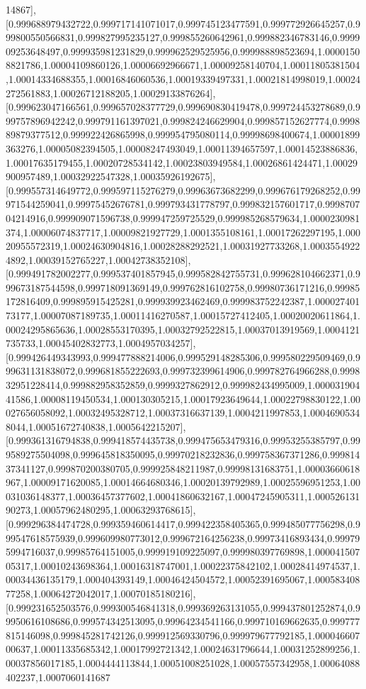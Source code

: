 \documentclass{article}
\begin{document}
14867],[0.999688979432722,0.999717141071017,0.999745123477591,0.999772926645257,0.999800550566831,0.999827995235127,0.999855260642961,0.999882346783146,0.999909253648497,0.999935981231829,0.999962529525956,0.999988898523694,1.00001508821786,1.00004109860126,1.00006692966671,1.00009258140704,1.00011805381504,1.00014334688355,1.00016846060536,1.00019339497331,1.00021814998019,1.00024272561883,1.00026712188205,1.00029133876264],[0.999623047166561,0.999657028377729,0.999690830419478,0.999724453278689,0.999757896942242,0.999791161397021,0.999824246629904,0.999857152627774,0.999889879377512,0.999922426865998,0.999954795080114,0.99998698400674,1.00001899363276,1.00005082394505,1.00008247493049,1.00011394657597,1.00014523886836,1.00017635179455,1.00020728534142,1.00023803949584,1.00026861424471,1.00029900957489,1.00032922547328,1.00035926192675],[0.999557314649772,0.999597115276279,0.99963673682299,0.999676179268252,0.99971544259041,0.99975452676781,0.999793431778797,0.999832157601717,0.999870704214916,0.999909071596738,0.999947259725529,0.999985268579634,1.0000230981374,1.00006074837717,1.00009821927729,1.0001355108161,1.00017262297195,1.00020955572319,1.00024630904816,1.00028288292521,1.00031927733268,1.00035549224892,1.00039152765227,1.00042738352108],[0.999491782002277,0.999537401857945,0.999582842755731,0.999628104662371,0.999673187544598,0.999718091369149,0.999762816102758,0.99980736171216,0.99985172816409,0.999895915425281,0.999939923462469,0.999983752242387,1.00002740173177,1.00007087189735,1.00011416270587,1.00015727412405,1.00020020611864,1.00024295865636,1.00028553170395,1.00032792522815,1.00037013919569,1.0004121735733,1.00045402832773,1.0004957034257],[0.999426449343993,0.999477888214006,0.999529148285306,0.999580229509469,0.999631131838072,0.999681855222693,0.999732399614906,0.999782764966288,0.999832951228414,0.999882958352859,0.9999327862912,0.999982434995009,1.00003190441586,1.00008119450534,1.000130305215,1.00017923649644,1.00022798830122,1.00027656058092,1.00032495328712,1.00037316637139,1.0004211997853,1.00046905348044,1.00051672740838,1.0005642215207],[0.999361316794838,0.999418574435738,0.999475653479316,0.99953255385797,0.999589275504098,0.999645818350095,0.99970218232836,0.999758367371286,0.99981437341127,0.999870200380705,0.999925848211987,0.99998131683751,1.00003660618967,1.00009171620085,1.00014664680346,1.00020139792989,1.00025596951253,1.00031036148377,1.00036457377602,1.00041860632167,1.00047245905311,1.00052613190273,1.00057962480295,1.00063293768615],[0.999296384474728,0.999359460614417,0.999422358405365,0.999485077756298,0.999547618575939,0.999609980773012,0.999672164256238,0.99973416893434,0.999795994716037,0.99985764151005,0.999919109225097,0.999980397769898,1.00004150705317,1.00010243698364,1.00016318747001,1.00022375842102,1.00028414974537,1.00034436135179,1.000404393149,1.00046424504572,1.00052391695067,1.00058340877258,1.00064272042017,1.00070185180216],[0.999231652503576,0.999300546841318,0.999369263131055,0.999437801252874,0.99950616108686,0.999574342513095,0.99964234541166,0.999710169662635,0.999777815146098,0.999845281742126,0.999912569330796,0.999979677792185,1.00004660700637,1.00011335685342,1.00017992721342,1.00024631796644,1.00031252899256,1.00037856017185,1.0004444113844,1.00051008251028,1.00057557342958,1.00064088402237,1.0007060141687
\end{document}
